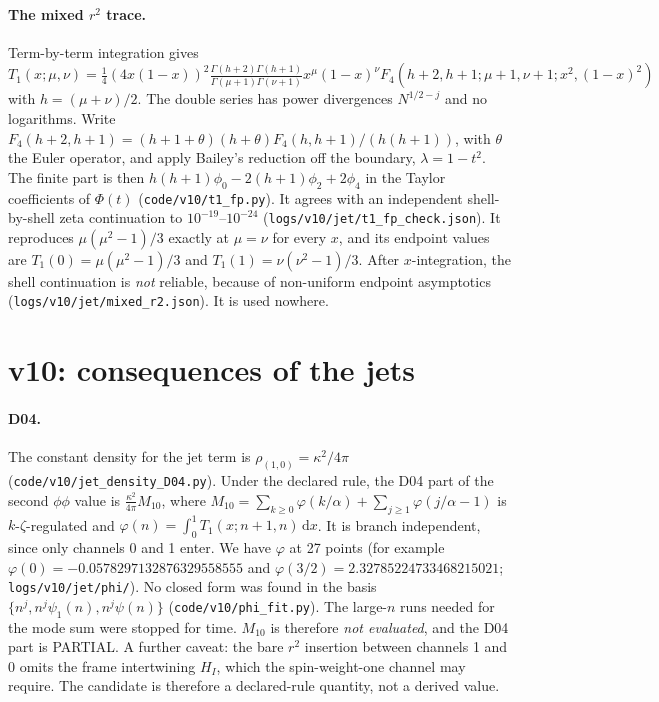 \documentclass[11pt,a4paper]{article}
\newcommand{\loc}[1]{\nolinkurl{#1}}
\newcommand{\PARTIAL}{\textsf{PARTIAL}}
\theoremstyle{plain}
\theoremstyle{definition}
\theoremstyle{remark}
\numberwithin{equation}{section}
\begin{document}
\paragraph{The mixed \(r^2\) trace.}
Term-by-term integration gives
\[
 T_1(x;\mu,\nu)=\tfrac14(4x(1-x))^2\tfrac{\Gamma(h+2)\Gamma(h+1)}{\Gamma(\mu+1)\Gamma(\nu+1)}x^\mu(1-x)^\nu
 F_4(h+2,h+1;\mu+1,\nu+1;x^2,(1-x)^2)
\]
with \(h=(\mu+\nu)/2\). The double series has power divergences
\(N^{1/2-j}\) and no logarithms. Write \(F_4(h+2,h+1)=(h+1+\theta)(h+\theta)F_4(h,h+1)/(h(h+1))\), with \(\theta\) the
Euler operator, and apply Bailey's reduction \cite{BaileyF4} off the boundary,
\(\lambda=1-t^2\). The finite part is then
\(h(h+1)\phi_0-2(h+1)\phi_2+2\phi_4\) in the Taylor coefficients
of \(\Phi(t)\) (\loc{code/v10/t1_fp.py}). It agrees with an
independent shell-by-shell zeta continuation to
\(10^{-19}\)--\(10^{-24}\) (\loc{logs/v10/jet/t1_fp_check.json}). It
reproduces \(\mu(\mu^2-1)/3\) exactly at \(\mu=\nu\) for every
\(x\), and its endpoint values are \(T_1(0)=\mu(\mu^2-1)/3\) and
\(T_1(1)=\nu(\nu^2-1)/3\). After \(x\)-integration, the shell
continuation is \emph{not} reliable, because of non-uniform
endpoint asymptotics (\loc{logs/v10/jet/mixed_r2.json}). It is used
nowhere.

\section{v10: consequences of the jets}
\label{sec:v10conseq}

\paragraph{D04.}
The constant density for the jet term is
\(\rho_{(1,0)}=\kappa^2/4\pi\) (\loc{code/v10/jet_density_D04.py}).
Under the declared rule, the D04 part of the second \(\phi\phi\)
value is
\(\tfrac{\kappa^2}{4\pi}M_{10}\), where
\(M_{10}=\sum_{k\ge0}\varphi(k/\alpha)+\sum_{j\ge1}\varphi(j/\alpha-1)\)
is \(k\)-\(\zeta\)-regulated and \(\varphi(n)=\int_0^1T_1(x;n+1,n)\,\mathrm dx\).
It is branch independent, since only channels 0 and 1 enter. We
have \(\varphi\) at 27 points (for example
\(\varphi(0)=-0.0578297132876329558555\) and
\(\varphi(3/2)=2.32785224733468215021\);
\loc{logs/v10/jet/phi/}). No closed form was found in the basis
\(\{n^j,n^j\psi_1(n),n^j\psi(n)\}\) (\loc{code/v10/phi_fit.py}). The
large-\(n\) runs needed for the mode sum were stopped for time.
\(M_{10}\) is therefore \emph{not evaluated}, and the D04 part is
\PARTIAL. A further caveat: the bare \(r^2\) insertion between
channels 1 and 0 omits the frame intertwining \(H_I\), which the
spin-weight-one channel may require. The candidate is therefore a
declared-rule quantity, not a derived value.
\end{document}
